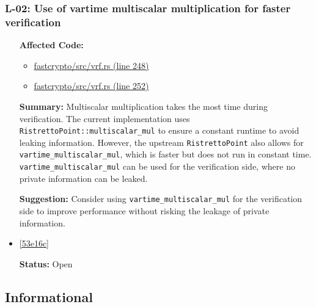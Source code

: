 \subsubsection*{L-02: Use of vartime multiscalar multiplication for faster verification}
\begin{itemize}[align=left]
\item[\textbf{Affected Code:}] \
\begin{itemize}
\item \href{https://github.com/MystenLabs/fastcrypto/blob/963205c6d0538fe548b8b10037cf87a53af6f424/fastcrypto/src/vrf.rs#L248}{fastcrypto/src/vrf.rs (line 248)}
\item \href{https://github.com/MystenLabs/fastcrypto/blob/963205c6d0538fe548b8b10037cf87a53af6f424/fastcrypto/src/vrf.rs#L252}{fastcrypto/src/vrf.rs (line 252)}
\end{itemize}
\item[\textbf{Summary:}] Multiscalar multiplication takes the most time during verification. The current implementation uses \lstinline{RistrettoPoint::multiscalar_mul} to ensure a constant runtime to avoid leaking information. However, the upstream \lstinline{RistrettoPoint} also allows for \lstinline{vartime_multiscalar_mul}, which is faster but does not run in constant time. \lstinline{vartime_multiscalar_mul} can be used for the verification side, where no private information can be leaked.
\item[\textbf{Suggestion:}] Consider using \lstinline{vartime_multiscalar_mul} for the verification side to improve performance without risking the leakage of private information.
\item[\textbf{Suggested Fix:}] \href{https://github.com/MystenLabs/fastcrypto/pull/543/commits/53e16c8f82d63a84cdc842d93fc5c26cebbe109b}{[53e16c]}
\item[\textbf{Status:}] Open
\end{itemize}

\subsection{Informational}
